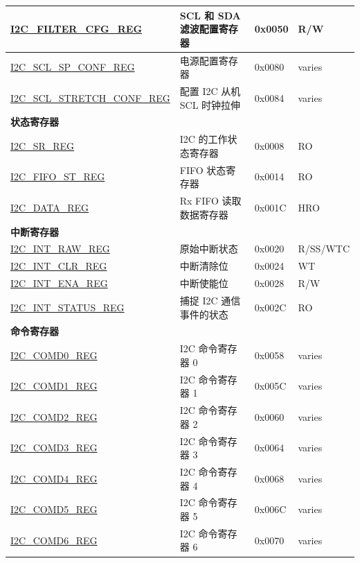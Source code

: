 \begin{longtable}{ | p{6cm} | p{7cm} | p{1.3cm} | p{1cm} | }
\hyperref[regdesc:I2CFILTERCFGREG]{I2C\_FILTER\_CFG\_REG} & SCL 和 SDA 滤波配置寄存器 & 0x0050 & R/W \\ \hline
\hyperref[regdesc:I2CSCLSPCONFREG]{I2C\_SCL\_SP\_CONF\_REG} & 电源配置寄存器 & 0x0080 & varies \\ \hline
\hyperref[regdesc:I2CSCLSTRETCHCONFREG]{I2C\_SCL\_STRETCH\_CONF\_REG} & 配置 I2C 从机 SCL 时钟拉伸 & 0x0084 & varies \\ \hline
\multicolumn{4}{|l|}{\textbf{状态寄存器}} \\ \hline
\hyperref[regdesc:I2CSRREG]{I2C\_SR\_REG} & I2C 的工作状态寄存器 & 0x0008 & RO \\ \hline
\hyperref[regdesc:I2CFIFOSTREG]{I2C\_FIFO\_ST\_REG} & FIFO 状态寄存器 & 0x0014 & RO \\ \hline
\hyperref[regdesc:I2CDATAREG]{I2C\_DATA\_REG} & Rx FIFO 读取数据寄存器 & 0x001C & HRO \\ \hline
\multicolumn{4}{|l|}{\textbf{中断寄存器}} \\ \hline
\hyperref[regdesc:I2CINTRAWREG]{I2C\_INT\_RAW\_REG} & 原始中断状态 & 0x0020 & R/SS/WTC \\ \hline
\hyperref[regdesc:I2CINTCLRREG]{I2C\_INT\_CLR\_REG} & 中断清除位 & 0x0024 & WT \\ \hline
\hyperref[regdesc:I2CINTENAREG]{I2C\_INT\_ENA\_REG} & 中断使能位 & 0x0028 & R/W \\ \hline
\hyperref[regdesc:I2CINTSTATUSREG]{I2C\_INT\_STATUS\_REG} & 捕捉 I2C 通信事件的状态 & 0x002C & RO \\ \hline
\multicolumn{4}{|l|}{\textbf{命令寄存器}} \\ \hline
\hyperref[regdesc:I2CCOMD0REG]{I2C\_COMD0\_REG} & I2C 命令寄存器 0 & 0x0058 & varies \\ \hline
\hyperref[regdesc:I2CCOMD1REG]{I2C\_COMD1\_REG} & I2C 命令寄存器 1 & 0x005C & varies \\ \hline
\hyperref[regdesc:I2CCOMD2REG]{I2C\_COMD2\_REG} & I2C 命令寄存器 2 & 0x0060 & varies \\ \hline
\hyperref[regdesc:I2CCOMD3REG]{I2C\_COMD3\_REG} & I2C 命令寄存器 3 & 0x0064 & varies \\ \hline
\hyperref[regdesc:I2CCOMD4REG]{I2C\_COMD4\_REG} & I2C 命令寄存器 4 & 0x0068 & varies \\ \hline
\hyperref[regdesc:I2CCOMD5REG]{I2C\_COMD5\_REG} & I2C 命令寄存器 5 & 0x006C & varies \\ \hline
\hyperref[regdesc:I2CCOMD6REG]{I2C\_COMD6\_REG} & I2C 命令寄存器 6 & 0x0070 & varies \\ \hline

\end{longtable}

